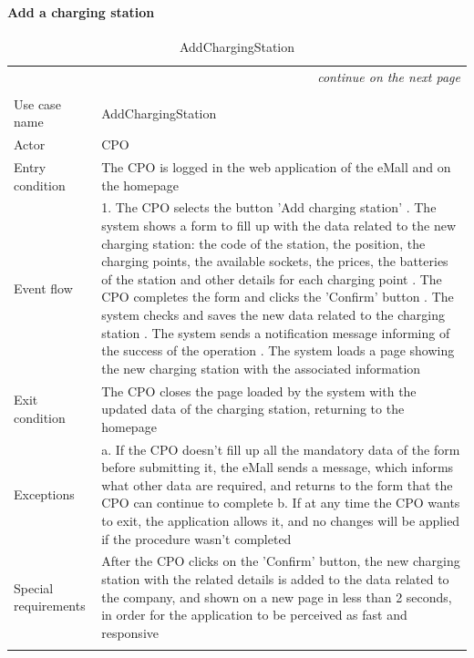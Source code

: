 \clearpage
\paragraph{Add a charging station}
\begin{center}
    \begin{longtable}{p{4cm} p{11cm}}
    \multicolumn{2}{r}{\itshape{continue on the next page}}\\
    \endfoot 
    \\
    \endlastfoot
    \hline
     Use case name &  AddChargingStation\\
     \hline
     Actor & CPO \\
     \hline
     Entry condition & The CPO is logged in the web application of the eMall and on the homepage \\
     \hline
     Event flow &   1. The CPO selects the button 'Add charging station' \newline
                    2. The system shows a form to fill up with the data related to the new charging station: the code of the station, the position, the charging points, the available sockets, the prices, the batteries of the station and other details for each charging point \newline
                    3. The CPO completes the form and clicks the 'Confirm' button \newline
                    4. The system checks and saves the new data related to the charging station \newline
                    5. The system sends a notification message informing of the success of the operation \newline
                    6. The system loads a page showing the new charging station with the associated information\\
     \hline
     Exit condition &  The CPO closes the page loaded by the system with the updated data of the charging station, returning to the homepage \\
     \hline
     Exceptions &   a. If the CPO doesn't fill up all the mandatory data of the form before submitting it, the eMall                sends a message, which informs what other data are required, and returns to the form that the                   CPO can continue to complete \newline
                    b. If at any time the CPO wants to exit, the application allows it, and no changes will be applied if the procedure wasn't completed \\
     \hline
     Special requirements & After the CPO clicks on the 'Confirm' button, the new charging station with the related details is added to the data related to the company, and shown on a new page in less than 2 seconds, in order for the application to be perceived as fast and responsive \\
     \hline
    \caption{AddChargingStation}
    \label{tab:AddChargingStation}
    \end{longtable}
\end{center}

